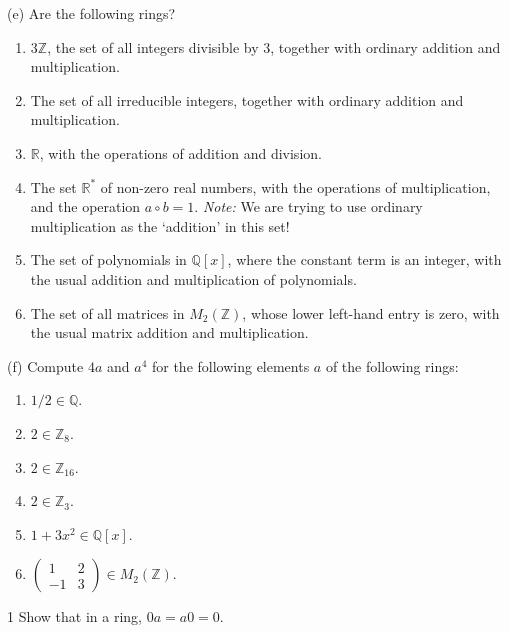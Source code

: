 \begin{problem}[Warmup]{(e)}
    Are the following rings?
    \begin{enumerate}
        \item[(a)] $3\mathbb{Z}$, the set of all integers divisible by 3, together with ordinary addition and multiplication.
        \item[(b)] The set of all irreducible integers, together with ordinary addition and multiplication.
        \item[(c)] $\mathbb{R}$, with the operations of addition and division.
        \item[(d)] The set $\mathbb{R}^*$ of non-zero real numbers, with the operations of multiplication, and the operation $a \circ b = 1$. \emph{Note:} We are trying to use ordinary multiplication as the `addition' in this set!
        \item[(e)] The set of polynomials in $\mathbb{Q}[x]$, where the constant term is an integer, with the usual addition and multiplication of polynomials.
        \item[(f)] The set of all matrices in $M_2(\mathbb{Z})$, whose lower left-hand entry is zero, with the usual matrix addition and multiplication.
    \end{enumerate}
\end{problem}
\unsolved

\begin{problem}[Warmup]{(f)}
    Compute $4a$ and $a^4$ for the following elements $a$ of the following rings:
    \begin{enumerate}
        \item[(a)] $1/2 \in \mathbb{Q}$.
        \item[(b)] $2 \in \mathbb{Z}_8$.
        \item[(c)] $2 \in \mathbb{Z}_{16}$.
        \item[(d)] $2 \in \mathbb{Z}_3$.
        \item[(e)] $1 + 3x^2 \in \mathbb{Q}[x]$.
        \item[(f)] $\begin{pmatrix} 1 & 2 \\ -1 & 3 \end{pmatrix} \in M_2(\mathbb{Z})$.
    \end{enumerate}
\end{problem}
\unsolved

\begin{problem}{1}
    Show that in a ring, $0a = a0 = 0$.
\end{problem}
\solved

